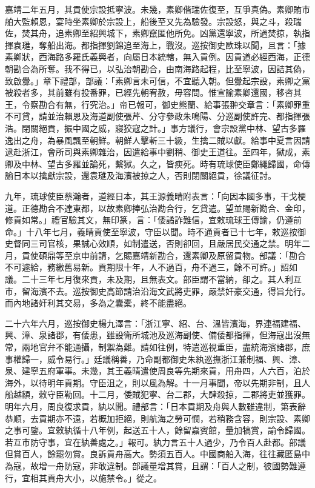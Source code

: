 \begin{pinyinscope}
嘉靖二年五月，其貢使宗設抵寧波。未幾，素卿偕瑞佐復至，互爭真偽。素卿賄市舶大監賴恩，宴時坐素卿於宗設上，船後至又先為驗發。宗設怒，與之斗，殺瑞佐，焚其舟，追素卿至紹興城下，素卿竄匿他所免。凶黨還寧波，所過焚掠，執指揮袁璡，奪船出海。都指揮劉錦追至海上，戰沒。巡按御史歐珠以聞，且言：「據素卿狀，西海路多羅氏義興者，向屬日本統轄，無入貢例。因貢道必經西海，正德朝勘合為所奪。我不得已，以弘治朝勘合，由南海路起程，比至寧波，因詰其偽，致啟釁。」章下禮部，部議：「素卿言未可信，不宜聽入朝。但釁起宗設，素卿之黨被殺者多，其前雖有投番罪，已經先朝宥赦，毋容問。惟宣諭素卿還國，移咨其王，令察勘合有無，行究治。」帝已報可，御史熊蘭、給事張翀交章言：「素卿罪重不可貸，請並治賴恩及海道副使張芹、分守參政朱鳴陽、分巡副使許完、都指揮張浩。閉關絕貢，振中國之威，寢狡寇之計。」事方議行，會宗設黨中林、望古多羅逸出之舟，為暴風飄至朝鮮。朝鮮人擊斬三十級，生擒二賊以獻。給事中夏言因請逮赴浙江，會所司與素卿雜治，因遣給事中劉稍、御史王道往。至四年，獄成，素卿及中林、望古多羅並論死，繫獄。久之，皆瘐死。時有琉球使臣鄭繩歸國，命傳諭日本以擒獻宗設，還袁璡及海濱被掠之人，否則閉關絕貢，徐議征討。

九年，琉球使臣蔡瀚者，道經日本，其王源義晴附表言：「向因本國多事，干戈梗道。正德勘合不達東都，以故素卿捧弘治勘合行，乞貸遣。望並賜新勘合、金印，修貢如常。」禮官驗其文，無印篆，言：「倭譎詐難信，宜敕琉球王傳諭，仍遵前命。」十八年七月，義晴貢使至寧波，守臣以聞。時不通貢者已十七年，敕巡按御史督同三司官核，果誠心效順，如制遣送，否則卻回，且嚴居民交通之禁。明年二月，貢使碩鼎等至京申前請，乞賜嘉靖新勘合，還素卿及原留貢物。部議：「勘合不可遽給，務繳舊易新。貢期限十年，人不過百，舟不過三，餘不可許。」詔如議。二十三年七月復來貢，未及期，且無表文。部臣謂不當納，卻之。其人利互市，留海濱不去。巡按御史高節請治沿海文武將吏罪，嚴禁奸豪交通，得旨允行。而內地諸奸利其交易，多為之囊橐，終不能盡絕。

二十六年六月，巡按御史楊九澤言：「浙江寧、紹、台、溫皆濱海，界連福建福、興、漳、泉諸郡，有倭患，雖設衛所城池及巡海副使、備倭都指揮，但海寇出沒無常，兩地官弁不能通攝，制禦為難。請如往例，特遣巡視重臣，盡統海濱諸郡，庶事權歸一，威令易行。」廷議稱善，乃命副都御史朱紈巡撫浙江兼制福、興、漳、泉、建寧五府軍事。未幾，其王義晴遣使周良等先期來貢，用舟四，人六百，泊於海外，以待明年貢期。守臣沮之，則以風為解。十一月事聞，帝以先期非制，且人船越額，敕守臣勒回。十二月，倭賊犯寧、台二郡，大肆殺掠，二郡將吏並獲罪。明年六月，周良復求貢，紈以聞。禮部言：「日本貢期及舟與人數雖違制，第表辭恭順，去貢期亦不遠，若概加拒絕，則航海之勞可憫，若稍務含容，則宗設、素卿之事可鑒。宜敕紈循十八年例，起送五十人，餘留嘉賓館，量加犒賞，諭令歸國。若互市防守事，宜在紈善處之。」報可。紈力言五十人過少，乃令百人赴都。部議但賞百人，餘罷勿賞。良訴貢舟高大。勢須五百人。中國商舶入海，往往藏匿島中為寇，故增一舟防寇，非敢違制。部議量增其賞，且謂：「百人之制，彼國勢難遵行，宜相其貢舟大小，以施禁令。」從之。


\end{pinyinscope}
